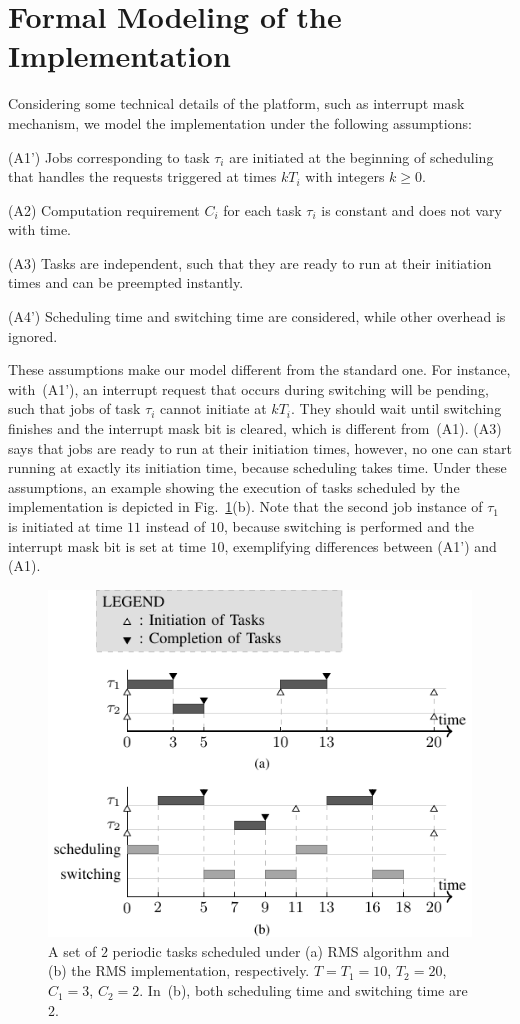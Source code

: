 \documentclass[12pt,onecolumn]{IEEEtranTIE}
\begin{document}
\section{Formal Modeling of the Implementation}
\label{s:formalism}
Considering some technical details of the platform, such as interrupt
mask mechanism, we model the implementation under the following
assumptions:

(A1') Jobs corresponding to task $\tau_i$ are initiated at the
beginning of scheduling that handles the requests triggered at times
$kT_i$ with integers $k\ge 0$.

(A2) Computation requirement $C_i$ for each task $\tau_i$ is constant
and does not vary with time.

(A3) Tasks are independent, such that they are ready to run at their
initiation times and can be preempted instantly.

(A4') Scheduling time and switching time are considered, while other
overhead is ignored.

These assumptions make our model different from the standard one. For
instance, with~(A1'), an interrupt request that occurs during
switching will be pending, such that jobs of task $\tau_i$ cannot
initiate at $kT_i$. They should wait until switching finishes and the
interrupt mask bit is cleared, which is different from~(A1). (A3) says
that jobs are ready to run at their initiation times, however, no one
can start running at exactly its initiation time, because scheduling
takes time. Under these assumptions, an example showing the execution
of tasks scheduled by the implementation is depicted in
Fig.~\ref{f:example}(b). Note that the second job instance of $\tau_1$
is initiated at time $11$ instead of $10$, because switching is
performed and the interrupt mask bit is set at time $10$, exemplifying
differences between (A1') and (A1).

\begin{figure}[!t]
\centering
\includegraphics{FIG2_15-TIE-3480.pdf}
\caption{A set of $2$ periodic tasks scheduled under (a) RMS algorithm
  and (b) the RMS implementation, respectively. $T=T_1=10$, $T_2=20$,
  $C_1=3$, $C_2=2$. In~(b), both scheduling time and switching time
  are $2$.}
\label{f:example}
\end{figure}
\end{document}
